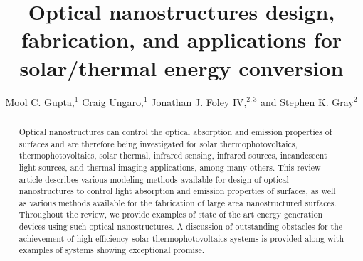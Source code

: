 \documentclass[review]{elsarticle}
\begin{document}
\begin{frontmatter}
\title{Optical nanostructures design, fabrication, and applications for solar/thermal energy conversion } %

\author{Mool C. Gupta,$^1$ Craig Ungaro,$^1$ 
Jonathan J. Foley IV,$^{2,3}$ and Stephen K. Gray$^2$}

\address{$^1$Department of Electrical \& Computer Engineering, University of Virginia, Charlottesville, Virginia, 22901, USA \\
$^2$Center for Nanoscale Materials, Argonne National Laboratory, 9700 South Cass Avenue, Argonne, IL, 60439, USA \\
$^3$Department of Chemistry, William Paterson University, 300 Pompton Road, Wayne, NJ, 07470, USA \\
$^1$mgupta@virginia.edu \\
$^2$gray@anl.gov}


\begin{abstract}
Optical nanostructures can control the optical absorption and emission properties of surfaces and are therefore being investigated for solar thermophotovoltaics, thermophotovoltaics, solar thermal, infrared sensing, infrared sources, incandescent light sources, and thermal imaging applications, among many others. This review article describes various modeling methods available for design of 
optical nanostructures to control light absorption and emission properties of surfaces, as well as various methods available for the fabrication of large area nanostructured surfaces. Throughout the review, we provide examples of state of the art energy generation devices using such 
optical nanostructures.  A discussion of outstanding obstacles for the achievement of high efficiency solar thermophotovoltaics systems is provided along with examples of systems showing exceptional promise. 
\end{abstract}

\begin{keyword}
\end{keyword}

\end{frontmatter}
\end{document}
